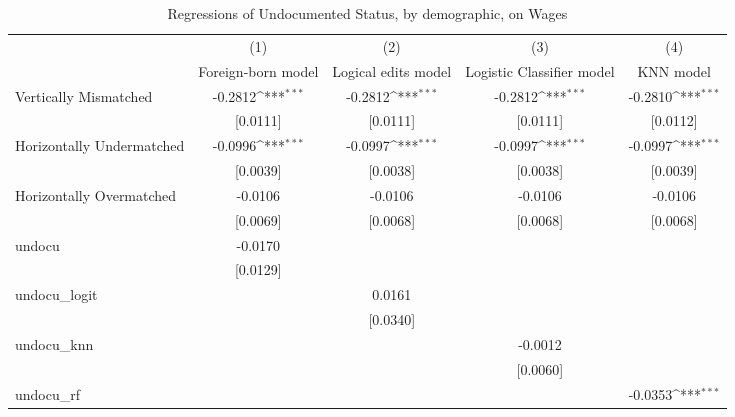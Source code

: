 \begin{table}[htbp]\centering
\def\sym#1{\ifmmode^{#1}\else\(^{#1}\)\fi}
\caption{Regressions of Undocumented Status, by demographic, on Wages}
\begin{tabular}{l*{4}{c}}
\toprule
                    &\multicolumn{1}{c}{(1)}         &\multicolumn{1}{c}{(2)}         &\multicolumn{1}{c}{(3)}         &\multicolumn{1}{c}{(4)}         \\
                    &Foreign-born model         &Logical edits model         &Logistic Classifier model         &   KNN model         \\
\midrule
Vertically Mismatched&     -0.2812\sym{***}&     -0.2812\sym{***}&     -0.2812\sym{***}&     -0.2810\sym{***}\\
                    &    [0.0111]         &    [0.0111]         &    [0.0111]         &    [0.0112]         \\
\addlinespace
Horizontally Undermatched&     -0.0996\sym{***}&     -0.0997\sym{***}&     -0.0997\sym{***}&     -0.0997\sym{***}\\
                    &    [0.0039]         &    [0.0038]         &    [0.0038]         &    [0.0039]         \\
\addlinespace
Horizontally Overmatched&     -0.0106         &     -0.0106         &     -0.0106         &     -0.0106         \\
                    &    [0.0069]         &    [0.0068]         &    [0.0068]         &    [0.0068]         \\
\addlinespace
undocu              &     -0.0170         &                     &                     &                     \\
                    &    [0.0129]         &                     &                     &                     \\
\addlinespace
undocu\_logit        &                     &      0.0161         &                     &                     \\
                    &                     &    [0.0340]         &                     &                     \\
\addlinespace
undocu\_knn          &                     &                     &     -0.0012         &                     \\
                    &                     &                     &    [0.0060]         &                     \\
\addlinespace
undocu\_rf           &                     &                     &                     &     -0.0353\sym{***}\\

\end{tabular}
\end{table}
